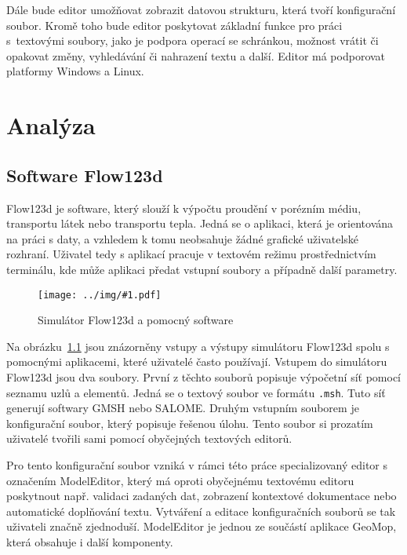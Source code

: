 \documentclass[FM,bw,DP]{tulthesis}
\newcommand{\includeimg}[2]{%
\begin{figure}[h]
	\centering
    \texttt{[image: ../img/\#1.pdf]}
    \caption{#2}
	\label{img:#1}
\end{figure}
}
\begin{document}
Dále bude editor umožňovat zobrazit datovou strukturu, která tvoří konfigurační soubor. Kromě toho bude editor poskytovat základní funkce pro práci s~textovými soubory, jako je podpora operací se schránkou, možnost vrátit či opakovat změny, vyhledávání či nahrazení textu a další. Editor má podporovat platformy Windows a Linux.



\chapter{Analýza}





\section{Software Flow123d}

Flow123d je software, který slouží k výpočtu proudění v porézním médiu, transportu látek nebo transportu tepla. Jedná se o aplikaci, která je orientována na práci s daty, a vzhledem k tomu neobsahuje žádné grafické uživatelské rozhraní. Uživatel tedy s aplikací pracuje v textovém režimu prostřednictvím terminálu, kde může aplikaci předat vstupní soubory a případně další parametry.

\includeimg{flow123d}{Simulátor Flow123d a pomocný software}

Na obrázku~\ref{img:flow123d} jsou znázorněny vstupy a výstupy simulátoru Flow123d spolu s pomocnými aplikacemi, které uživatelé často používají. Vstupem do simulátoru Flow123d jsou dva soubory. První z těchto souborů popisuje výpočetní síť pomocí seznamu uzlů a elementů. Jedná se o textový soubor ve formátu \texttt{.msh}. Tuto síť generují softwary GMSH nebo SALOME. Druhým vstupním souborem je konfigurační soubor, který popisuje řešenou úlohu. Tento soubor si prozatím uživatelé tvořili sami pomocí obyčejných textových editorů.

Pro tento konfigurační soubor vzniká v rámci této práce specializovaný editor s označením ModelEditor, který má oproti obyčejnému textovému editoru poskytnout např. validaci zadaných dat, zobrazení kontextové dokumentace nebo automatické doplňování textu. Vytváření a editace konfiguračních souborů se tak uživateli značně zjednoduší. ModelEditor je jednou ze součástí aplikace GeoMop, která obsahuje i další komponenty.
\end{document}
